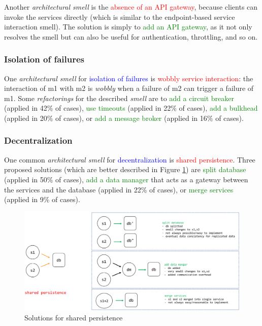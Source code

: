 Another \textit{architectural smell} is the \textcolor{red}{absence of an API gateway}, because clients can invoke the services directly (which is similar to the endpoint-based service interaction smell). The solution is simply to \textcolor{green}{add an API gateway}, as it not only resolves the smell but can also be useful for authentication, throttling, and so on.

\newpage 

\subsubsection{Isolation of failures}

One \textit{architectural smell} for \textcolor{blue}{isolation of failures} is \textcolor{red}{wobbly service interaction}: the interaction of m1 with m2 is \textit{wobbly} when a failure of m2 can trigger a failure of m1. Some \textit{refactorings} for the described \textit{smell} are to \textcolor{green}{add a circuit breaker} (applied in 42\% of cases), \textcolor{green}{use timeouts} (applied in 22\% of cases), \textcolor{green}{add a bulkhead} (applied in 20\% of cases), or \textcolor{green}{add a message broker} (applied in 16\% of cases).

\subsubsection{Decentralization}

One common \textit{architectural smell} for \textcolor{blue}{decentralization} is \textcolor{red}{shared persistence}. Three proposed solutions (which are better described in Figure \ref{fig:shared_persistence}) are \textcolor{green}{split database} (applied in 50\% of cases), \textcolor{green}{add a data manager} that acts as a gateway between the services and the database (applied in 22\% of cases), or \textcolor{green}{merge services} (applied in 9\% of cases).

\begin{figure} [H]
    \centering
    \includegraphics[width=1\textwidth]{images/Microservices/shared_persistence.PNG}
    \caption{Solutions for shared persistence}
    \label{fig:shared_persistence}
\end{figure} 

